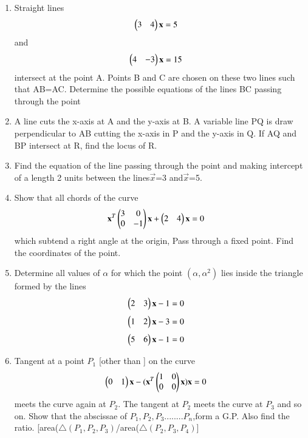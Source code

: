 \begin{enumerate}
    \item Straight lines\begin{align}\begin{pmatrix}3 & 4\end{pmatrix} \mathbf {x}  &= 5 \end{align} and \begin{align}\begin{pmatrix}4 & -3\end{pmatrix} \mathbf {x}  &= 15 \end{align} intersect at the point A. Points B and C are chosen on these two lines such that AB=AC. Determine the possible equations of the lines BC passing through the point
    \item A line cuts the x-axis at A and the y-axis at B. A variable line PQ is draw perpendicular to AB cutting the x-axis in P and the y-axis in Q. If AQ and BP intersect at R, find the locus of R.
    \item Find the equation of the line passing through the point and making intercept of a length 2 units between the lines$\vec {x}$=3 and$\vec {x}$=5.
    \item Show that all chords of the curve  \begin{align}\mathbf{x}^T\begin{pmatrix}3 & 0 \\ 0 & -1\end{pmatrix} \mathbf {x} + \begin{pmatrix}2 & 4\end{pmatrix} \mathbf {x} &= 0 \end{align} which subtend a right angle at the origin, Pass through a fixed point. Find the coordinates of the point.
    \item Determine all values of $\alpha$ for which the point $(\alpha, \alpha^2)$ lies inside the triangle formed by the lines 
    \begin{align}\begin{pmatrix}2 & 3\end{pmatrix} \mathbf {x} -1 &= 0 \end{align} \begin{align}\begin{pmatrix}1 & 2\end{pmatrix} \mathbf {x} -3 &= 0 \end{align}  \begin{align}\begin{pmatrix}5 & 6\end{pmatrix} \mathbf {x} -1 &= 0 \end{align}
    \item Tangent at a point $P_1$ [other than ] on the curve 
    \begin{align}\begin{pmatrix}0 & 1\end{pmatrix}\mathbf{x} - (\mathbf{x}^T \begin{pmatrix}1 & 0 \\ 0 & 0\end{pmatrix} \mathbf {x})\mathbf {x}  &= 0 \end{align} meets the curve again at $P_2$. The tangent at $P_2$ meets the curve at $P_3$ and so on. Show that the abscissae of $P_1,P_2,P_3........P_n$,form a G.P. Also find the ratio. [area($\triangle(P_1,P_2,P_3)$/area($\triangle(P_2,P_3,P_4)$]

\end{enumerate}
